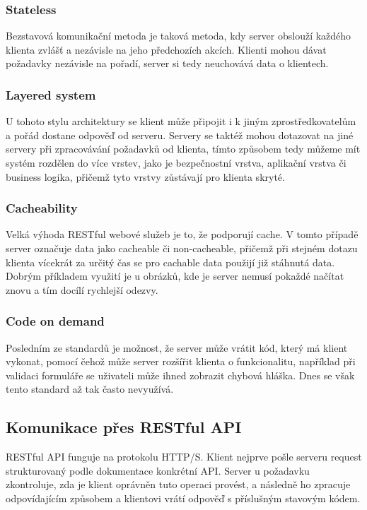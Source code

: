\subsubsection*{Stateless}
Bezstavová komunikační metoda je taková metoda, kdy server obslouží každého klienta zvlášť a nezávisle na jeho předchozích akcích. Klienti mohou dávat požadavky nezávisle na pořadí, server si tedy neuchovává data o klientech.

\subsubsection*{Layered system}
U tohoto stylu architektury se klient může připojit i k jiným zprostředkovatelům a pořád dostane odpověď od serveru. Servery se taktéž mohou dotazovat na jiné servery při zpracovávání požadavků od klienta, tímto způsobem tedy můžeme mít systém rozdělen do více vrstev, jako je bezpečnostní vrstva, aplikační vrstva či business logika, přičemž tyto vrstvy zůstávají pro klienta skryté.

\subsubsection*{Cacheability}
Velká výhoda RESTful webové služeb je to, že podporují cache. V tomto případě server označuje data jako cacheable či non-cacheable, přičemž při stejném dotazu klienta vícekrát za určitý čas se pro cachable data použijí již stáhnutá data. Dobrým příkladem využití je u obrázků, kde je server nemusí pokaždé načítat znovu a tím docílí rychlejší odezvy.

\subsubsection*{Code on demand}
Posledním ze standardů je možnost, že server může vrátit kód, který má klient vykonat, pomocí čehož může server rozšířit klienta o funkcionalitu, například při validaci formuláře se uživateli může ihned zobrazit chybová hláška. Dnes se však tento standard až tak často nevyužívá.


\subsection{Komunikace přes RESTful API} %
RESTful API funguje na protokolu HTTP/S. Klient nejprve pošle serveru request strukturovaný podle dokumentace konkrétní API. Server u požadavku zkontroluje, zda je klient oprávněn tuto operaci provést, a následně ho zpracuje odpovídajícím způsobem a klientovi vrátí odpověď s příslušným stavovým kódem.

